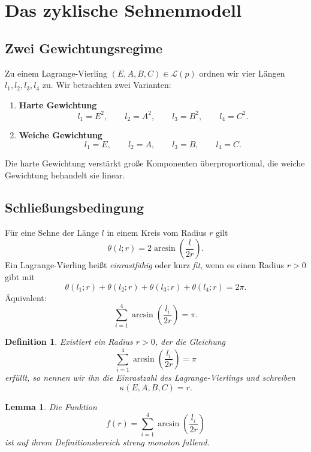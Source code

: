 \documentclass[11pt,a4paper]{article}
\newtheorem{definition}{Definition}
\newtheorem{lemma}{Lemma}
\theoremstyle{remark}
\begin{document}
	\section{Das zyklische Sehnenmodell}
	
	\subsection{Zwei Gewichtungsregime}
	
	Zu einem Lagrange-Vierling \((E,A,B,C)\in\mathcal L(p)\) ordnen wir vier Längen \(l_1,l_2,l_3,l_4\) zu. Wir betrachten zwei Varianten:
	
	\begin{enumerate}[label=\arabic*)]
		\item \textbf{Harte Gewichtung}
		\[
		l_1 = E^2,\qquad l_2 = A^2,\qquad l_3 = B^2,\qquad l_4 = C^2.
		\]
		
		\item \textbf{Weiche Gewichtung}
		\[
		l_1 = E,\qquad l_2 = A,\qquad l_3 = B,\qquad l_4 = C.
		\]
	\end{enumerate}
	
	Die harte Gewichtung verstärkt große Komponenten überproportional, die weiche Gewichtung behandelt sie linear.
	
	\subsection{Schließungsbedingung}
	
	Für eine Sehne der Länge \(l\) in einem Kreis vom Radius \(r\) gilt
	\[
	\theta(l;r)=2\arcsin\!\left(\frac{l}{2r}\right).
	\]
	Ein Lagrange-Vierling heißt \emph{einrastfähig} oder kurz \emph{fit}, wenn es einen Radius \(r>0\) gibt mit
	\[
	\theta(l_1;r)+\theta(l_2;r)+\theta(l_3;r)+\theta(l_4;r)=2\pi.
	\]
	Äquivalent:
	\[
	\sum_{i=1}^4 \arcsin\!\left(\frac{l_i}{2r}\right)=\pi.
	\]
	
	\begin{definition}
		Existiert ein Radius \(r>0\), der die Gleichung
		\[
		\sum_{i=1}^4 \arcsin\!\left(\frac{l_i}{2r}\right)=\pi
		\]
		erfüllt, so nennen wir ihn die \emph{Einrastzahl} des Lagrange-Vierlings und schreiben
		\[
		\kappa(E,A,B,C)=r.
		\]
	\end{definition}
	
	\begin{lemma}
		Die Funktion
		\[
		f(r)=\sum_{i=1}^4 \arcsin\!\left(\frac{l_i}{2r}\right)
		\]
		ist auf ihrem Definitionsbereich streng monoton fallend.
	\end{lemma}
	
\end{document}
